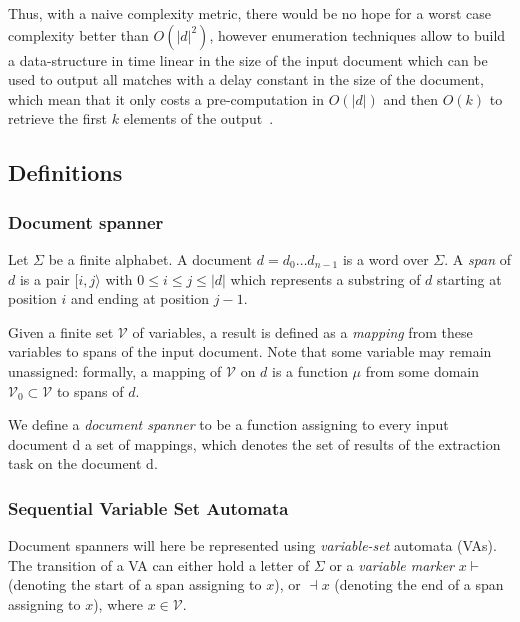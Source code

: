 \documentclass[12px]{article}
\begin{document}
      Thus, with a naive complexity metric, there would be no hope for a worst
      case complexity better than $O(|d|^2)$, however enumeration techniques
      allow to build a data-structure in time linear in the size of the input
      document which can be used to output all matches with a delay constant in
      the size of the document, which mean that it only costs a pre-computation
      in $O(|d|)$ and then $O(k)$ to retrieve the first $k$ elements of the
      output~\cite{ICDT19}.

    \subsection{Definitions}

      \subsubsection*{Document spanner}

        Let $\Sigma$ be a finite alphabet. A document $d = d_0 \dots d_{n−1}$
        is a word over $\Sigma$. A \textit{span} of $d$ is a pair $[i,
        j\rangle$ with $0 \leq i \leq j \leq |d|$ which represents a substring
        of $d$ starting at position $i$ and ending at position $j - 1$.

        Given a finite set $\mathcal{V}$ of variables, a result is defined as a
        \textit{mapping} from these variables to spans of the input document.
        Note that some variable may remain unassigned: formally, a mapping of
        $\mathcal{V}$ on $d$ is a function $\mu$ from some domain
        $\mathcal{V}_0 \subset \mathcal{V}$ to spans of $d$.

        We define a \textit{document spanner} to be a function assigning to
        every input document d a set of mappings, which denotes the set of
        results of the extraction task on the document d.

      \subsubsection*{Sequential Variable Set Automata}

        Document spanners will here be represented using \textit{variable-set}
        automata (VAs). The transition of a VA can either hold a letter of
        $\Sigma$ or a \textit{variable marker} $x \vdash$ (denoting the
        start of a span assigning to $x$), or $\dashv x$ (denoting the end of
        a span assigning to $x$), where $x \in \mathcal{V}$.
\end{document}
